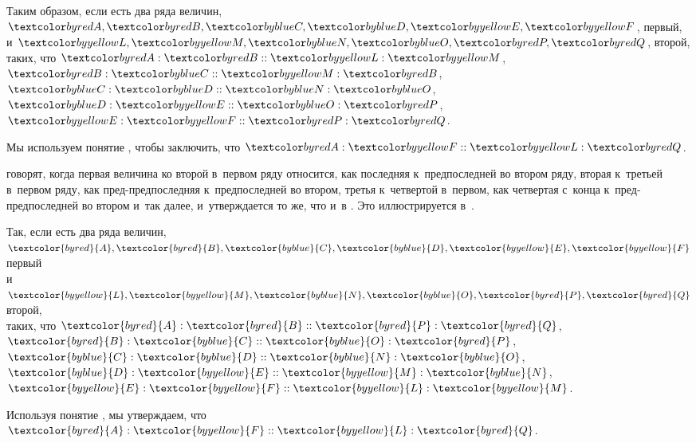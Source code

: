 \documentclass{byrne-book}
\begin{document}
\begin{center}
Таким образом, если есть два ряда величин,\\
$\varA, \varB, \varC, \varD, \varE, \varF$, первый,\\
и $\varL, \varM, \varN, \varO, \varP, \varQ$, второй,\\
таких, что $\varA : \varB :: \varL : \varM$, $\varB : \varC :: \varM : \varB$, $\varC : \varD :: \varN : \varO$, $\varD : \varE :: \varO : \varP$, $\varE : \varF :: \varP : \varQ$.

Мы используем понятие , чтобы заключить, что $\varA : \varF :: \varL : \varQ$.
\end{center}


\vfill\pagebreak

\label{def:V.XX}
\def\varA{\textcolor{byred}{A}}
\def\varB{\textcolor{byred}{B}}
\def\varC{\textcolor{byblue}{C}}
\def\varD{\textcolor{byblue}{D}}
\def\varE{\textcolor{byyellow}{E}}
\def\varF{\textcolor{byyellow}{F}}
\def\varL{\textcolor{byyellow}{L}}
\def\varM{\textcolor{byyellow}{M}}
\def\varN{\textcolor{byblue}{N}}
\def\varO{\textcolor{byblue}{O}}
\def\varP{\textcolor{byred}{P}}
\def\varQ{\textcolor{byred}{Q}}
 говорят, когда первая величина ко второй в~первом ряду относится, как последняя к~предпоследней во втором ряду, вторая к~третьей в~первом ряду, как пред-предпоследняя к~предпоследней во втором, третья к~четвертой в~первом, как четвертая с~конца к~пред-предпоследней во втором и~так далее, и~утверждается то же, что и~в . Это иллюстрируется в~.

\begin{center}
Так, если есть два ряда величин,\\
$\varA, \varB, \varC, \varD, \varE, \varF$ первый\\
и $\varL, \varM, \varN, \varO, \varP, \varQ$ второй,\\
таких, что $\varA : \varB :: \varP : \varQ$, $\varB : \varC :: \varO : \varP$, $\varC : \varD :: \varN : \varO$, $\varD : \varE :: \varM : \varN$, $\varE : \varF :: \varL : \varM$.

Используя понятие , мы утверждаем, что $\varA : \varF :: \varL : \varQ$.
\end{center}


\vfill\pagebreak

\label{prop:V.XX}
\end{document}
